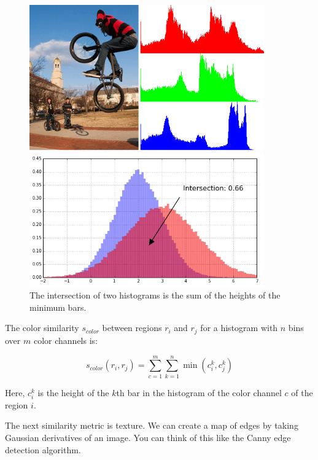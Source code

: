 \documentclass{article}
\begin{document}
\begin{figure}[htbp]
    \centering
    \begin{minipage}{0.45\textwidth}
        \centering
        \includegraphics[width=0.9\textwidth]{histogram.png} %
    \end{minipage}\hfill
    \begin{minipage}{0.45\textwidth}
        \centering
        \includegraphics[width=0.9\textwidth]{intersection.png} %
        \caption{The intersection of two histograms is the sum of the heights of the minimum bars.}
    \end{minipage}
\end{figure}


The color similarity $s_{color}$ between regions $r_i$ and $r_j$ for a histogram with $n$ bins over $m$ color channels is:

\[s_{color}(r_i, r_j) = \sum_{c=1}^m\sum_{k=1}^n \min(c_i^k, c_j^k)\]

Here, $c_i^k$ is the height of the $k$th bar in the histogram of the color channel $c$ of the region $i$.

The next similarity metric is texture. We can create a map of edges by taking Gaussian derivatives of an image. You can think of this like the Canny edge detection algorithm.
\end{document}
